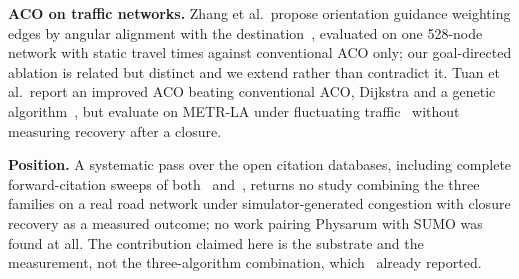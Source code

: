 \textbf{ACO on traffic networks.} Zhang et al.\ propose orientation
guidance weighting edges by angular alignment with the
destination~\cite{zhang2018novel}, evaluated on one 528-node network with
static travel times against conventional ACO only; our goal-directed
ablation is related but distinct and we extend rather than contradict it.
Tuan et al.\ report an improved ACO beating conventional ACO, Dijkstra and a
genetic algorithm~\cite{tuan2026improved}, but evaluate on METR-LA under
fluctuating traffic~\cite{li2018diffusion} without measuring recovery after a
closure.

\textbf{Position.} A systematic pass over the open citation databases,
including complete forward-citation sweeps of
both~\cite{zhang2014improved} and~\cite{watanabe2011traffic}, returns no
study combining the three families on a real road network under
simulator-generated congestion with closure recovery as a measured outcome;
no work pairing Physarum with SUMO was found at all. The contribution
claimed here is the substrate and the measurement, not the three-algorithm
combination, which~\cite{zhang2014improved} already reported.
